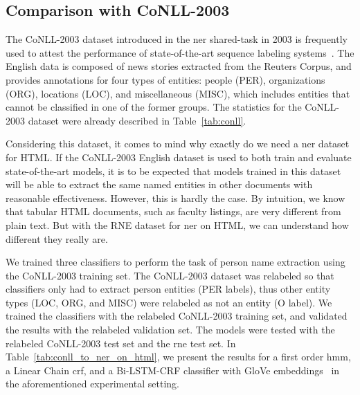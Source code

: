 \documentclass{nle}
\begin{document}
\subsection{Comparison with {CoNLL-2003}}
\label{sec:conll_comparison}

The {CoNLL-2003} dataset introduced in the \gls{ner}
shared-task in 2003 is frequently used to attest 
the performance of state-of-the-art sequence labeling systems~\cite{Huang2015,Lample2016,Ma2016,Peters2018}. 
The English data is composed of news stories extracted from the Reuters Corpus, and 
provides annotations for four types of entities: people (PER), organizations (ORG), 
locations (LOC), and miscellaneous (MISC), which includes entities that cannot be 
classified in one of the former groups. The statistics for the {CoNLL-2003} dataset 
were already described in Table~\ref{tab:conll}.

Considering this dataset, it comes to mind why exactly do we need a \gls{ner} dataset for HTML. 
If the {CoNLL-2003} English dataset is used to both train and evaluate 
state-of-the-art models, it is to be expected that models trained in this dataset will
be able to extract the same named entities in other documents with reasonable 
effectiveness. However, this is hardly the case. By intuition, we know that tabular HTML 
documents, such as faculty listings, are very different from plain text. But with the
RNE dataset for \gls{ner} on HTML, we can understand how different they really are.

We trained three classifiers to perform the task of person name extraction using
the {CoNLL-2003} training set. The {CoNLL-2003} dataset was relabeled so that classifiers only had to extract
person entities (PER labels), thus other entity types (LOC, ORG, and MISC) were relabeled as
not an entity (O label). We trained the classifiers with the relabeled {CoNLL-2003} training set,
and validated the results with the relabeled validation set. The models were tested with the relabeled {CoNLL-2003}
test set and the \gls{rne} test set.
In Table~\ref{tab:conll_to_ner_on_html}, we present the results for a first order \gls{hmm}, 
a Linear Chain \gls{crf}, and a Bi-LSTM-CRF classifier with GloVe embeddings~\cite{Huang2015} in the 
aforementioned experimental setting.
\end{document}
